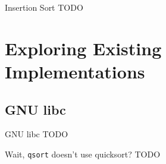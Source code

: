 \documentclass[13pt]{beamer}
\begin{document}
\begin{frame}{Insertion Sort}
	TODO
\end{frame}

\section{Exploring Existing Implementations}
\subsection{GNU libc}
\begin{frame}{GNU libc}
	TODO
\end{frame}

\begin{frame}{Wait, \texttt{qsort} doesn't use quicksort?}
	TODO
\end{frame}



\end{document}
